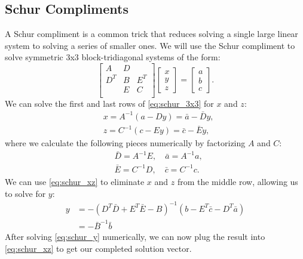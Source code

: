 \documentclass[../root.tex]{subfiles}
\newcommand{\0}{{\transparent{0} \resizebox{\mycellheight}{\mycellheight}{0}}}
\begin{document}
\subsection{Schur Compliments} \label{sec:schur_compliments}
A Schur compliment is a common trick that reduces solving a single large linear system to solving a 
series of smaller ones. We will use the
Schur compliment to solve symmetric 3x3 block-tridiagonal systems of the form: 
\begin{equation} \label{eq:schur_3x3}
    \begin{bmatrix}
        A   & D & \\
        D^T & B & E^T \\
            & E & C \\
    \end{bmatrix}
    \begin{bmatrix}
        x \\ y \\ z
    \end{bmatrix} = 
    \begin{bmatrix}
        a \\ b \\ c
    \end{bmatrix}.
\end{equation}
We can solve the first and last rows of \eqref{eq:schur_3x3} for $x$ and $z$:
\begin{subequations} \label{eq:schur_xz}
\begin{align}
    &x = A^{-1}(a - D y) = \bar{a} - \bar{D} y \label{eq:schur_x}, \\
    &z = C^{-1}(c - E y) = \bar{c} - \bar{E} y \label{eq:schur_z},
\end{align}
\end{subequations}
where we calculate the following pieces numerically by factorizing $A$ and $C$:
\begin{subequations} \label{eq:schur_temps}
\begin{align}
    &\bar{D} = A^{-1} E, \quad \bar{a} = A^{-1} a, \\
    &\bar{E} = C^{-1} D, \quad \bar{c} = C^{-1} c.
\end{align}
\end{subequations}
We can use \eqref{eq:schur_xz} to eliminate $x$ and $z$ from the middle row, allowing us to 
solve for $y$:
\begin{equation} \label{eq:schur_y}
    \begin{aligned}
        y &= -(D^T \bar{D} + E^T \bar{E} - B)^{-1}(b - E^T \bar{c} - D^T \bar{a}) \\
          &= -\bar{B}^{-1} \bar{b}
    \end{aligned}
\end{equation}
After solving \eqref{eq:schur_y} numerically, we can now plug the result into
\eqref{eq:schur_xz} to get our completed solution vector. 
\end{document}
